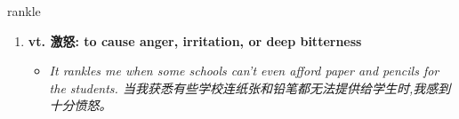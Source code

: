
\begin{frame}
{\huge rankle}
\begin{center}
\begin{enumerate}\Large
  \item \textbf{vt. 激怒: to cause anger, irritation, or deep bitterness}
  \begin{itemize}
    \item \em{\Large{It rankles me when some schools can't even afford paper and pencils for the students. 当我获悉有些学校连纸张和铅笔都无法提供给学生时,我感到十分愤怒。}}
  \end{itemize}
\end{enumerate}
\end{center}
\end{frame}
